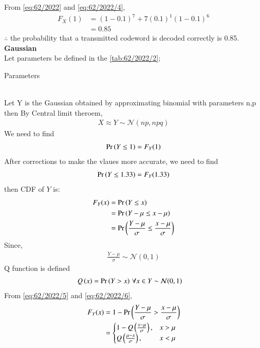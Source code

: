 \documentclass[article]{IEEEtran}
\theoremstyle{remark}
\begin{document}
From \eqref{eq:62/2022} and \eqref{eq:62/2022/4}, 
\begin{align}
    F_X(1) &= (1-0.1)^{7}+7(0.1)^1(1-0.1)^{6} \\
    &= 0.85
\end{align}
$\therefore$ the probability that a transmitted codeword is decoded correctly is 0.85.
\newpage
\textbf{Gaussian}\\
Let parameters be defined in the \autoref{tab:62/2022/2};
\begin{table}[h]
	\centering
	
	\caption{Parameters}
        \label{tab:62/2022/2}
\end{table}
\\Let Y is the Gaussian obtained by approximating binomial with parameters n,p then By Central limit theroem, 
\begin{align}
	X \approx Y \sim \mathcal{N}(np,npq)
\end{align}
We need to find 
\begin{align}
	\Pr\left(Y \le 1\right) = F_Y(1)
\end{align}
After corrections to make the vlaues more accurate, we need to find
\begin{align}
	\Pr\left(Y \le 1.33\right) = F_Y(1.33)
\end{align}
then CDF of $Y$ is:
\begin{align}
	F_Y(x)&=\Pr\left(Y \le x\right) \\
	&=\Pr\left(Y-\mu \le x-\mu\right) \\
	&=\Pr\left(\frac{Y-\mu}{\sigma} \le \frac{x-\mu}{\sigma}\right) \label{eq:62/2022/5}
\end{align}
Since, 
\begin{align}
	\frac{Y-\mu}{\sigma} \sim \mathcal{N}(0,1)
\end{align}
Q function is defined
\begin{align}
	Q\left(x\right) &= \Pr\left(Y > x\right) \, \forall x \in Y \sim \mathcal{N}(0,1) \label{eq:62/2022/6}
\end{align}
From \eqref{eq:62/2022/5} and \eqref{eq:62/2022/6}, 
\begin{align}
	F_Y(x)&=1-\Pr\left(\frac{Y-\mu}{\sigma} > \frac{x-\mu}{\sigma}\right)\\
	&= 
    \begin{cases}
        1-Q\left( \frac{x-\mu}{\sigma}\right), &  x > \mu \\
        Q\left( \frac{\mu-x}{\sigma}\right) , &  x < \mu
    \end{cases} \label{eq:62/2022/7}
\end{align}
\end{document}

